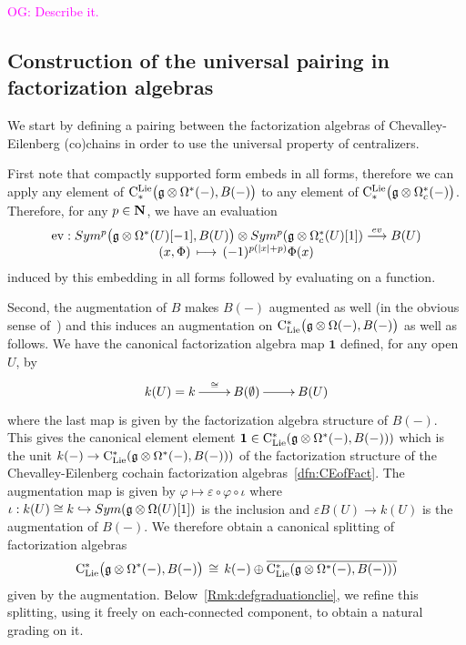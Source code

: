\documentclass[11pt]{amsart}
\numberwithin{equation}{section}
\def\owen{\textcolor{magenta}{OG: }\textcolor{magenta}}
\begin{document}
\owen{Describe it.}

\subsection{Construction of the universal pairing in factorization algebras}\label{SS:constuctionthetaf}

We start by defining a pairing between the factorization algebras of Chevalley-Eilenberg (co)chains in order to use the universal property of centralizers.

\smallskip 

First note that compactly supported form embeds in all forms, therefore we can apply 
any element of ${\rm C}^{\rm Lie}_*\big(\mathfrak g \otimes \Omega^* (-), B(-)\big)$ 
to any element of ${\rm C}^{\rm Lie}_*\big(\mathfrak g \otimes \Omega_c^* (-)\big)$. Therefore, for any  $p\in \mathbf N$, we have an evaluation 
\begin{equation} \label{eqdef:ev} \begin{array}{c}{\rm ev}: Sym^p \big( \mathfrak g \otimes \Omega^* (U)[-1] ,B(U)\big)
\otimes  Sym^p( \mathfrak g\otimes \Omega^*_c(U) [1]) \stackrel{ev}\longrightarrow B(U)  
  \\
 (x,\Phi) \,\longmapsto\, (-1)^{p(|x|+p) } \Phi (x)\end{array}
\end{equation} induced by this embedding  in all forms followed by evaluating on a function.



\smallskip

Second, the augmentation of $B$ makes $B(-)$ augmented as well (in the obvious sense of~\cite{Gi-NotesFactorization}) and this induces an augmentation on
${\rm C}_{\rm Lie}^*\big(\mathfrak g\otimes \Omega (-), B(-) \big)$ as well as follows. 
We have the canonical factorization algebra map  $\mathbf{1}$  defined, for any open $U$, by 
\[\xymatrix{ k(U)=k  \ar[r]^{\quad \cong}& 
B(\emptyset) \ar[r] & B(U)  } 
 \] where the last map is given by the factorization algebra structure of $B(-)$. This gives the canonical element element 
 $\mathbf{1}\in {\rm C}_{\rm Lie}^*(\mathfrak g\otimes \Omega^*(-), B(-)) )$ which is the unit $k(-)\to {\rm C}_{\rm Lie}^*(\mathfrak g\otimes \Omega^*(-), B(-)) )$
 of the factorization structure of 
 the Chevalley-Eilenberg cochain factorization algebras~\ref{dfn:CEofFact}.  
 The augmentation map is given by $\varphi\mapsto \varepsilon \circ \varphi \circ 
 \iota$ where $\iota: k(U) \cong k \hookrightarrow Sym(\mathfrak g \otimes \Omega (U) [1]) $ is the inclusion and $\varepsilon B(U)\to k(U)$ is the augmentation of 
 $B(-)$. We therefore obtain a canonical splitting of factorization algebras 
 \begin{equation}\label{eq:splittingbyaugm}
   {\rm C}_{\rm Lie}^*\big(\mathfrak g\otimes \Omega^*(-), B(-)\big)  \, \cong \, k(-) \oplus \overline{ {\rm C}_{\rm Lie}^*(\mathfrak g\otimes \Omega^*(-), B(-)) )}
 \end{equation}
given by the augmentation. Below~\ref{Rmk:defgraduationclie}, we refine  this splitting, using it  freely  on each-connected component, to obtain 
a natural grading on it.
 
\end{document}
